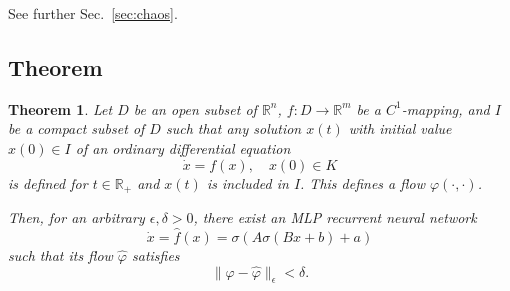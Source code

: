 \documentclass{article}
\newtheorem{theorem}{Theorem}
\theoremstyle{definition}
\theoremstyle{remark}
\newcommand{\reals}{\mathbb{R}}
\newcounter{ct}
\begin{document}
See further Sec.~\ref{sec:chaos}.

\subsection{Theorem}
\begin{theorem}
Let $D$ be an open subset of $\mathbb{R}^n$, $f\colon D \to \mathbb{R}^m$ be a $C^1$-mapping, and $I$ be a compact subset of $D$ such that any solution $x(t)$ with initial value $x(0) \in I$ of an ordinary differential equation
\begin{equation}\label{eq:5}
    \dot{x} = f(x), \quad x(0) \in K
\end{equation}
is defined for $t\in\reals_{+}$ and $x(t)$ is included in $I$.
This defines a flow $\varphi(\cdot, \cdot)$.


 Then, for an arbitrary $\epsilon, \delta > 0$, there exist an MLP recurrent neural network 
 \begin{equation}
\dot x = \hat f(x) = \sigma(A\sigma(Bx+b)+a)
\end{equation}
such that its flow $\hat \varphi$ satisfies
\begin{equation}
\|\varphi-\hat \varphi\|_\epsilon < \delta.
\end{equation}
\end{theorem}
\end{document}

